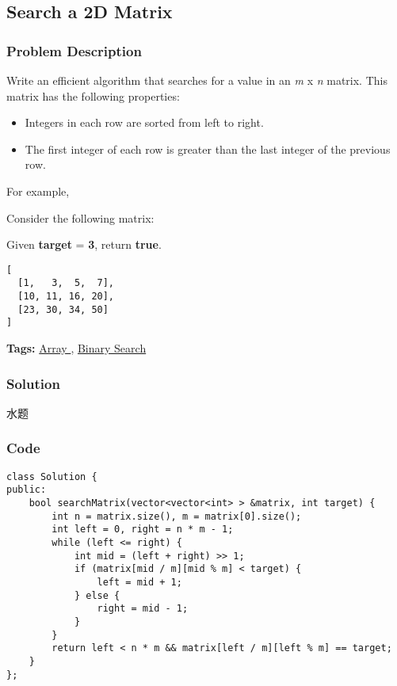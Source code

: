 \documentclass{article}
\begin{document}
\begin{CJK*}{UTF8}{gkai}
\begin{lstlisting}
\end{lstlisting}


\subsection{ Search a 2D Matrix }
\label{ Search a 2D Matrix }

\subsubsection*{Problem Description}
Write an efficient algorithm that searches for a value in an \emph{m} x \emph{n} matrix. This matrix has the following properties:

\begin{itemize}
\item Integers in each row are sorted from left to right.
\item The first integer of each row is greater than the last integer of the previous row.
\end{itemize}

For example,

Consider the following matrix:

Given \textbf{target} = \textbf{3}, return \textbf{true}.

\begin{verbatim}
[
  [1,   3,  5,  7],
  [10, 11, 16, 20],
  [23, 30, 34, 50]
]
\end{verbatim}

\textbf{Tags: }
\hyperref[ Array ]{ Array },  \hyperref[ Binary Search ]{ Binary Search }



\subsubsection*{Solution}
水题

\subsubsection*{Code}
\begin{lstlisting}
class Solution {
public:
    bool searchMatrix(vector<vector<int> > &matrix, int target) {
        int n = matrix.size(), m = matrix[0].size();
        int left = 0, right = n * m - 1;
        while (left <= right) {
            int mid = (left + right) >> 1;
            if (matrix[mid / m][mid % m] < target) {
                left = mid + 1;
            } else {
                right = mid - 1;
            }
        }
        return left < n * m && matrix[left / m][left % m] == target;
    }
}; 
\end{lstlisting}



\end{CJK*}
\end{document}
